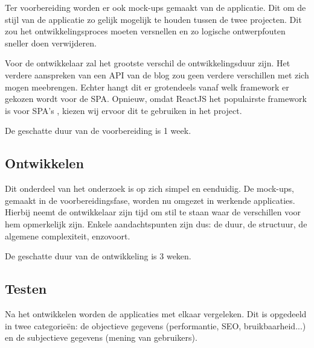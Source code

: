 \documentclass{hogent-article}
\begin{document}
Ter voorbereiding worden er ook mock-ups gemaakt van de applicatie.
Dit om de stijl van de applicatie zo gelijk mogelijk te houden tussen de twee projecten.
Dit zou het ontwikkelingsproces moeten versnellen en zo logische ontwerpfouten sneller doen verwijderen.

Voor de ontwikkelaar zal het grootste verschil de ontwikkelingsduur zijn.
Het verdere aanspreken van een API van de blog zou geen verdere verschillen met zich mogen meebrengen.
Echter hangt dit er grotendeels vanaf welk framework er gekozen wordt voor de SPA.
Opnieuw, omdat ReactJS het populairste framework is voor SPA's \autocite{Gathoni2022}, kiezen wij ervoor dit te gebruiken in het project.

De geschatte duur van de voorbereiding is 1 week.

\subsection{Ontwikkelen}
Dit onderdeel van het onderzoek is op zich simpel en eenduidig.
De mock-ups, gemaakt in de voorbereidingsfase, worden nu omgezet in werkende applicaties.
Hierbij neemt de ontwikkelaar zijn tijd om stil te staan waar de verschillen voor hem opmerkelijk zijn.
Enkele aandachtspunten zijn dus:
de duur,
de structuur,
de algemene complexiteit,
enzovoort.

De geschatte duur van de ontwikkeling is 3 weken.

\subsection{Testen}
Na het ontwikkelen worden de applicaties met elkaar vergeleken.
Dit is opgedeeld in twee categorieën:
de objectieve gegevens (performantie, SEO, bruikbaarheid...) en de subjectieve gegevens (mening van gebruikers).
\end{document}
